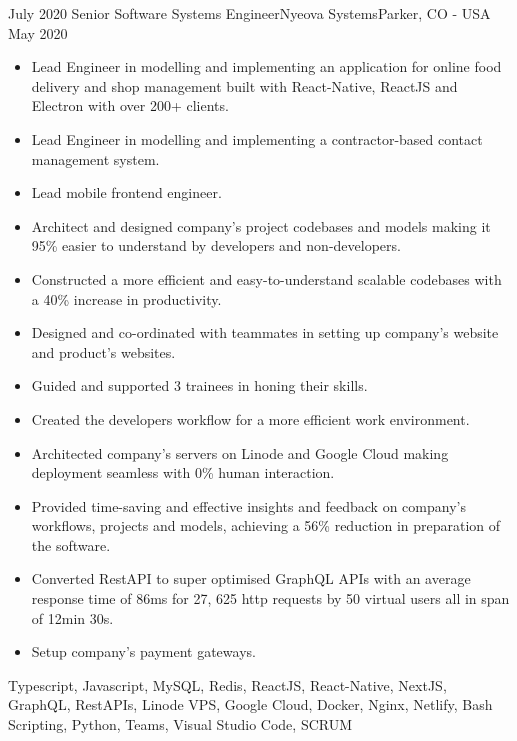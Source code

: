 %
%
%

\begin{experiences}
  
      \experience
    {July 2020}   {Senior Software Systems Engineer}{Nyeova Systems}{Parker, CO - USA}
    {May 2020} {
                      \begin{itemize}
                         \item	Lead Engineer in modelling and implementing an application for online food delivery and shop management built with React-Native, ReactJS and Electron with over 200+ clients.
                         \item Lead Engineer in modelling and implementing a contractor-based contact management system.
			\item Lead mobile frontend engineer.
			\item Architect and designed company's project codebases and models making it 95\% easier to understand by developers and non-developers.
			\item Constructed a more efficient and easy-to-understand scalable codebases with a 40\% increase in productivity.
			\item Designed and co-ordinated with teammates in setting up company's website and product's websites.
			\item Guided and supported 3 trainees in honing their skills.
			\item Created the developers workflow for a more efficient work environment.
			\item Architected company’s servers on Linode and Google Cloud making deployment seamless with 0\% human interaction.
			\item Provided time-saving and effective insights and feedback on company's workflows, projects and models, achieving a 56\% reduction in preparation of the software.
			\item Converted RestAPI to super optimised GraphQL APIs with an average response time of 86ms for 27, 625 http requests by 50 virtual users all in span of 12min 30s.
			\item Setup company's payment gateways.
		    \end{itemize}
                    }
                    {Typescript, Javascript, MySQL, Redis, ReactJS, React-Native, NextJS, GraphQL, RestAPIs, Linode VPS, Google Cloud, Docker, Nginx, Netlify, Bash Scripting, Python, Teams, Visual Studio Code, SCRUM}
  \emptySeparator
  

\end{experiences}
